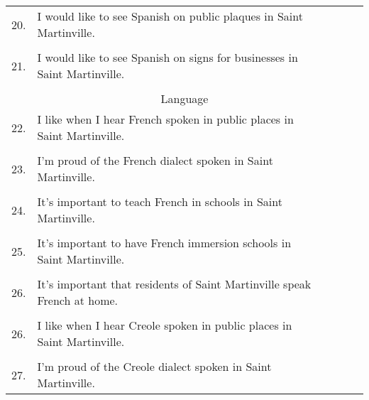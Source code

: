 \begin{longtable}[c]{| r p{} | c | c | c | c |}
          &                                                                           & & & & \\
      \hline
      20. & I would like to see Spanish on public plaques in Saint Martinville.       & & & & \\
          &                                                                           & & & & \\
      \hline
      21. & I would like to see Spanish on signs for businesses in Saint Martinville. & & & & \\
          &                                                                           & & & & \\
      \hline
      \multicolumn{6}{c}{Language} \\
      \hline
      22. & I like when I hear French spoken in public places in Saint Martinville.   & & & & \\
          &                                                                           & & & & \\
      \hline
      23. & I'm proud of the French dialect spoken in Saint Martinville.              & & & & \\
          &                                                                           & & & & \\
      \hline
      24. & It's important to teach French in schools in Saint Martinville.           & & & & \\
          &                                                                           & & & & \\
      \hline
      25. & It's important to have French immersion schools in Saint Martinville.     & & & & \\
          &                                                                           & & & & \\
      \hline
      26. & It's important that residents of Saint Martinville speak French at home.  & & & & \\
          &                                                                           & & & & \\
      \hline
      26. & I like when I hear Creole spoken in public places in Saint Martinville.   & & & & \\
          &                                                                           & & & & \\
      \hline
      27. & I'm proud of the Creole dialect spoken in Saint Martinville.              & & & & \\

\end{longtable}
